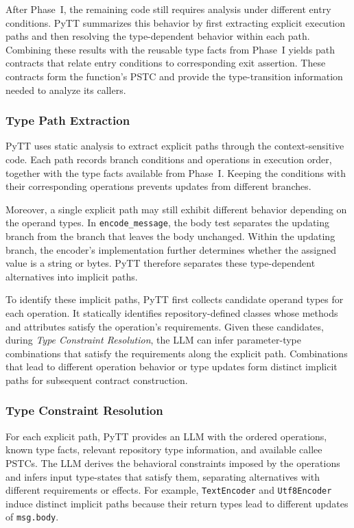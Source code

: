 After Phase~I, the remaining code still requires analysis under different
entry conditions. PyTT summarizes this behavior by first extracting
explicit execution paths and then resolving the type-dependent behavior
within each path. Combining these results with the reusable type facts
from Phase~I yields path contracts that relate entry conditions to corresponding exit assertion. 
These contracts form the function's PSTC
and provide the type-transition information needed to analyze its callers.

\subsubsection{Type Path Extraction}

PyTT uses static analysis to extract explicit paths through the
context-sensitive code. Each path records branch conditions and
operations in execution order, together with the type facts available
from Phase~I. Keeping the conditions with their corresponding operations
prevents updates from different branches.

Moreover, a single explicit path may still exhibit different behavior
depending on the operand types.
In \texttt{encode\_message}, the body test separates the updating branch
from the branch that leaves the body unchanged.
Within the updating branch, the encoder's implementation further
determines whether the assigned value is a string or bytes.
PyTT therefore separates these type-dependent alternatives into
implicit paths.

To identify these implicit paths, PyTT first collects candidate operand
types for each operation.
It statically identifies repository-defined classes whose methods
and attributes satisfy the operation's requirements.
Given these candidates, during \textit{Type Constraint Resolution}, 
the LLM can infer parameter-type combinations
that satisfy the requirements along the explicit path.
Combinations that lead to different operation behavior or type updates
form distinct implicit paths for subsequent contract construction.

\subsubsection{Type Constraint Resolution}

For each explicit path, PyTT provides an LLM with the ordered operations,
known type facts, relevant repository type information, and available
callee PSTCs. The LLM derives the behavioral constraints imposed by the
operations and infers input type-states that satisfy them, separating
alternatives with different requirements or effects. For example,
\texttt{TextEncoder} and \texttt{Utf8Encoder} induce distinct implicit
paths because their return types lead to different updates of
\texttt{msg.body}.

